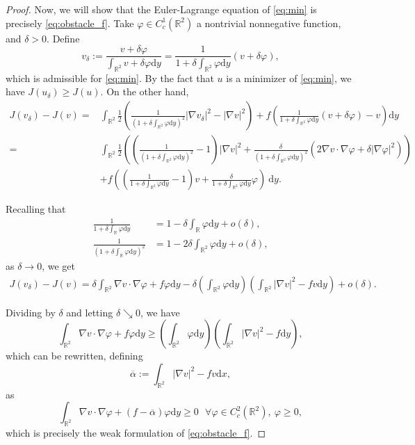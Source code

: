 \documentclass[10pt,a4paper]{article}
\newcommand{\RR}{\mathbb{R}}
\newcommand{\faskip}{\hspace{8pt}}
\numberwithin{equation}{section}
\begin{document}
\begin{proof}
Now, we will show that the Euler-Lagrange equation of \eqref{eq:min} is precisely \eqref{eq:obstacle_f}. Take $\varphi \in C_c^1(\RR^2)$ a nontrivial nonnegative function, and $\delta >0$. Define
\[v_{\delta} := \frac{v + \delta \varphi}{\int_{\RR^2} v+ \delta \varphi \mathrm{d}y} = \frac{1}{1 + \delta \int_{\RR^2} \varphi \mathrm{d}y} (v+\delta \varphi),\]
which is admissible for \eqref{eq:min}. By the fact that $u$ is a minimizer of \eqref{eq:min}, we have $J(u_{\delta}) \geq J(u)$. On the other hand,
\begin{align*}
J(v_{\delta}) - J(v) =& \int_{\RR^2} \frac12\left( \frac{1}{\left( 1+ \delta \int_{\RR^2} \varphi \mathrm{d}y\right)^2}|\nabla v_{\delta}|^2 - |\nabla v|^2 \right) + f\left(\frac{1}{1 + \delta \int_{\RR^2} \varphi \mathrm{d}y} (v+\delta \varphi) - v\right)\mathrm{d}y \\
=& \int_{\RR^2} \frac12\left( \left( \frac{1}{\left( 1 + \delta \int_{\RR^2} \varphi \mathrm{d}y\right)^2}- 1\right) |\nabla v|^2 +  \frac{\delta}{\left( 1+ \delta \int_{\RR^2} \varphi \mathrm{d}y\right)^2} (2 \nabla v \cdot \nabla \varphi + \delta |\nabla \varphi|^2) \right) \\ & + f\left(\left(\frac{1}{1 + \delta \int_{\RR^2} \varphi \mathrm{d}y} - 1 \right)v + \frac{\delta}{1 + \delta \int_{\RR^2} \varphi \mathrm{d}y} \varphi\right)~ \mathrm{d}y. 
\end{align*}

Recalling that
\begin{align*}
\frac{1}{1 + \delta \int_{\RR} \varphi \mathrm{d}y} &= 1 - \delta \int_{\RR} \varphi \mathrm{d}y + o(\delta), \\
\frac{1}{\left(1 + \delta \int_{\RR} \varphi \mathrm{d}y\right)^2} &= 1 - 2\delta \int_{\RR^2} \varphi \mathrm{d}y + o(\delta),
\end{align*}
as $\delta \rightarrow 0$, we get
\begin{align*}
J(v_{\delta})-J(v)= \delta \int_{\RR^2} \nabla v \cdot \nabla\varphi  + f\varphi \mathrm{d}y - \delta \left(\int_{\RR^2} \varphi \mathrm{d}y	\right) \left(\int_{\RR^2} |\nabla v|^2 - f v \mathrm{d}y\right)  + o(\delta).
\end{align*}

Dividing by $\delta$ and letting $\delta \searrow 0$, we have
\[\int_{\RR^2} \nabla v \cdot \nabla\varphi  + f \varphi \mathrm{d}y \geq \left(\int_{\RR^2} \varphi \mathrm{d}y\right) \left(\int_{\RR^2} |\nabla v|^2 - f \mathrm{d}y\right),\]
which can be rewritten, defining
\begin{equation}
	\label{eq:alpha}
	\overline{\alpha} := \int_{\RR^2} |\nabla v|^2 - fv \mathrm{d}x,
\end{equation}
as 
\[
\int_{\RR^2} \nabla v \cdot \nabla\varphi  +( f - \overline{\alpha}) \varphi \mathrm{d}y \geq 0 \faskip \forall \varphi \in C^2_{c}(\RR^2),~\varphi \geq 0,
\]
which is precisely the weak formulation of \eqref{eq:obstacle_f}. 


\end{proof}
\end{document}
